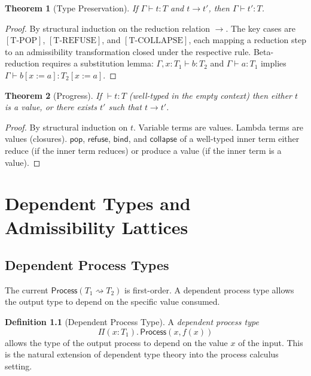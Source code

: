 \documentclass[12pt, a4paper, openany]{book}
\theoremstyle{plain}
\newtheorem{theorem}{Theorem}[chapter]
\theoremstyle{definition}
\newtheorem{definition}[theorem]{Definition}
\theoremstyle{remark}
\newcommand{\Proc}{\mathsf{Process}}
\begin{document}
\begin{theorem}[Type Preservation]
If $\Gamma \vdash t : T$ and $t \to t'$, then $\Gamma \vdash t' : T$.
\end{theorem}

\begin{proof}
By structural induction on the reduction relation $\to$. The key cases are
$[\mathrm{T\text{-}POP}]$, $[\mathrm{T\text{-}REFUSE}]$, and
$[\mathrm{T\text{-}COLLAPSE}]$, each mapping a reduction step to an admissibility
transformation closed under the respective rule. Beta-reduction requires a
substitution lemma: $\Gamma, x : T_1 \vdash b : T_2$ and $\Gamma \vdash a : T_1$
implies $\Gamma \vdash b[x := a] : T_2[x := a]$.
\end{proof}

\begin{theorem}[Progress]
If $\vdash t : T$ (well-typed in the empty context) then either $t$ is a value,
or there exists $t'$ such that $t \to t'$.
\end{theorem}

\begin{proof}
By structural induction on $t$. Variable terms are values. Lambda terms are values
(closures). $\mathsf{pop}$, $\mathsf{refuse}$, $\mathsf{bind}$, and
$\mathsf{collapse}$ of a well-typed inner term either reduce (if the inner term
reduces) or produce a value (if the inner term is a value).
\end{proof}

\chapter{Dependent Types and Admissibility Lattices}

\section{Dependent Process Types}

The current $\Proc(T_1 \rightsquigarrow T_2)$ is first-order. A dependent process
type allows the output type to depend on the specific value consumed.

\begin{definition}[Dependent Process Type]
A \emph{dependent process type}
\[
\Pi(x : T_1).\, \Proc(x, f(x))
\]
allows the type of the output process to depend on the value $x$ of the input.
This is the natural extension of dependent type theory into the process calculus
setting.
\end{definition}
\end{document}
